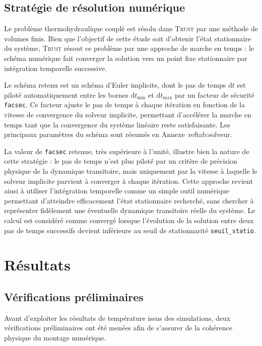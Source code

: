 \subsection{Stratégie de résolution numérique}

Le problème thermohydraulique couplé est résolu dans \textsc{Trust} par une méthode de volumes finis. Bien que l'objectif de cette étude soit d'obtenir l'état stationnaire du système, \textsc{Trust} résout ce problème par une approche de marche en temps : le schéma numérique fait converger la solution vers un point fixe stationnaire par intégration temporelle successive.

Le schéma retenu est un schéma d'Euler implicite, dont le pas de temps $\mathrm{d}t$ est piloté automatiquement entre les bornes $\mathrm{d}t_{\mathrm{min}}$ et $\mathrm{d}t_{\mathrm{max}}$ par un facteur de sécurité \texttt{facsec}. Ce facteur ajuste le pas de temps à chaque itération en fonction de la vitesse de convergence du solveur implicite, permettant d'accélérer la marche en temps tant que la convergence du système linéaire reste satisfaisante. Les principaux paramètres du schéma sont résumés en Annexe~ref{tab:solveur}.

La valeur de \texttt{facsec} retenue, très supérieure à l'unité, illustre bien la nature de cette stratégie : le pas de temps n'est plus piloté par un critère de précision physique de la dynamique transitoire, mais uniquement par la vitesse à laquelle le solveur implicite parvient à converger à chaque itération. Cette approche revient ainsi à utiliser l'intégration temporelle comme un simple outil numérique permettant d'atteindre efficacement l'état stationnaire recherché, sans chercher à représenter fidèlement une éventuelle dynamique transitoire réelle du système. Le calcul est considéré comme convergé lorsque l'évolution de la solution entre deux pas de temps successifs devient inférieure au seuil de stationnarité \texttt{seuil\_statio}.


\section{Résultats}

\subsection{Vérifications préliminaires}

Avant d'exploiter les résultats de température issus des simulations, deux vérifications préliminaires ont été menées afin de s'assurer de la cohérence physique du montage numérique.

